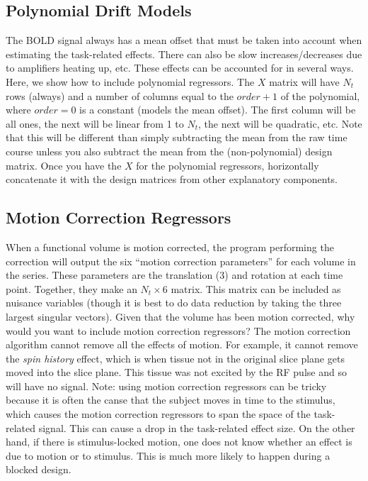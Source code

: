 \documentclass{article}
\begin{document}
\subsection{Polynomial Drift Models}

\noindent
The BOLD signal always has a mean offset that must be taken into
account when estimating the task-related effects. There can also be
slow increases/decreases due to amplifiers heating up, etc.
These effects can be accounted for in several ways. Here, we show how 
to include polynomial regressors. The $X$ matrix will have $N_t$ rows
(always) and a number of columns equal to the $order+1$ of the
polynomial, where $order=0$ is a constant (models the mean
offset). The first column will be all ones, the next will be linear
from 1 to $N_t$, the next will be quadratic, etc. Note that this will
be different than simply subtracting the mean from the raw time course
unless you also subtract the mean from the (non-polynomial) design
matrix. Once you have the $X$ for the polynomial regressors,
horizontally concatenate it with the design matrices from other
explanatory components.

\subsection{Motion Correction Regressors}

\noindent
When a functional volume is motion corrected, the program performing
the correction will output the six ``motion correction parameters''
for each volume in the series. These parameters are the translation
(3) and rotation at each time point. Together, they make an $N_t
\times 6$ matrix. This matrix can be included as nuisance variables
(though it is best to do data reduction by taking the three largest
singular vectors). Given that the volume has been motion corrected,
why would you want to include motion correction regressors? The motion
correction algorithm cannot remove all the effects of motion. For
example, it cannot remove the {\em spin history} effect, which is when
tissue not in the original slice plane gets moved into the slice
plane. This tissue was not excited by the RF pulse and so will have no
signal. Note: using motion correction regressors can be tricky because
it is often the canse that the subject moves in time to the stimulus,
which causes the motion correction regressors to span the space of the
task-related signal. This can cause a drop in the task-related effect
size. On the other hand, if there is stimulus-locked motion, one does
not know whether an effect is due to motion or to stimulus. This is
much more likely to happen during a blocked design.\\
\end{document}
